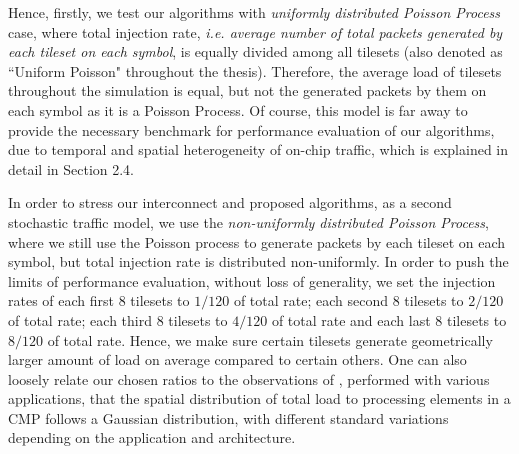 Hence, firstly, we test our algorithms with \textit{uniformly distributed Poisson Process} case, where total injection rate, \textit{i.e. average number of total packets generated by each tileset on each symbol}, is equally divided among all tilesets (also denoted as ``Uniform Poisson" throughout the thesis). Therefore, the average load of tilesets throughout the simulation is equal, but not the generated packets by them on each symbol as it is a Poisson Process. Of course, this model is far away to provide the necessary benchmark for performance evaluation of our algorithms, due to temporal and spatial heterogeneity of on-chip traffic, which is explained in detail in Section 2.4. 

In order to stress our interconnect and proposed algorithms, as a second stochastic traffic model, we use the \textit{non-uniformly distributed Poisson Process}, where we still use the Poisson process to generate packets by each tileset on each symbol, but total injection rate is distributed non-uniformly. In order to push the limits of performance evaluation, without loss of generality, we set the injection rates of each first 8 tilesets to $1/120$ of total rate; each second 8 tilesets to $2/120$ of total rate; each third 8 tilesets to $4/120$ of total rate and each last 8 tilesets to $8/120$ of total rate. Hence, we make sure certain tilesets generate geometrically larger amount of load on average compared to certain others. One can also loosely relate our chosen ratios to the observations of \cite{soteriou2006statistical}, performed with various applications, that the spatial distribution of total load to processing elements in a CMP follows a Gaussian distribution, with different standard variations depending on the application and architecture. 

